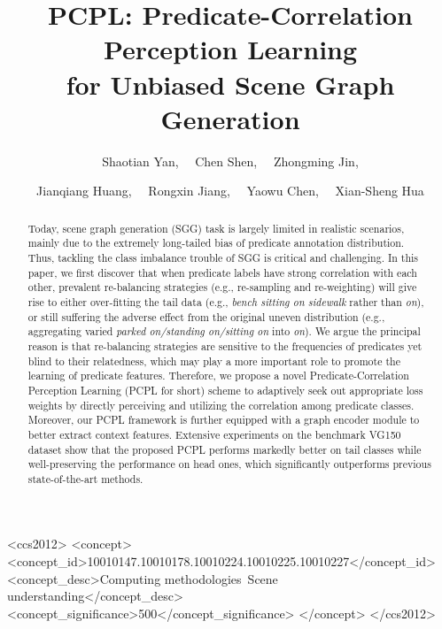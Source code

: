 \documentclass[sigconf]{acmart}
\begin{document}
\fancyhead{}
\title{PCPL: Predicate-Correlation Perception Learning \\ for Unbiased Scene Graph Generation}

\author{Shaotian Yan, \ \ Chen Shen, \ \ Zhongming Jin, }
\author{Jianqiang Huang, \ \ Rongxin Jiang, \ \ Yaowu Chen, \ \ Xian-Sheng Hua }


\renewcommand{\shortauthors}{Yan et al.}
\renewcommand{\thefootnote}{\fnsymbol{footnote}}
\begin{abstract}
  Today, scene graph generation (SGG) task is largely limited in realistic scenarios, mainly due to the extremely long-tailed bias of predicate annotation distribution.
  Thus, tackling the class imbalance trouble of SGG is critical and challenging. 
  In this paper, we first discover that when predicate labels have strong correlation with each other, prevalent re-balancing strategies (e.g., re-sampling and re-weighting) will give rise to either over-fitting the tail data (e.g., \emph{bench sitting on sidewalk} rather than \emph{on}), or still suffering the adverse effect from the original uneven distribution (e.g., aggregating varied \emph{parked on/standing on/sitting on} into \emph{on}). 
  We argue the principal reason is that re-balancing strategies are sensitive to the frequencies of predicates yet blind to their relatedness, which may play a more important role to promote the learning of predicate features.
  Therefore, we propose a novel Predicate-Correlation Perception Learning (PCPL for short) scheme to adaptively seek out appropriate loss weights by directly perceiving and utilizing the correlation among predicate classes. 
  Moreover, our PCPL framework is further equipped with a graph encoder module to better extract context features. Extensive experiments on the benchmark VG150 dataset show that the proposed PCPL performs markedly better on tail classes while well-preserving the performance on head ones,  which significantly outperforms previous state-of-the-art methods.
\end{abstract}

\begin{CCSXML}
<ccs2012>
<concept>
<concept_id>10010147.10010178.10010224.10010225.10010227</concept_id>
<concept_desc>Computing methodologies~Scene understanding</concept_desc>
<concept_significance>500</concept_significance>
</concept>
</ccs2012>
\end{CCSXML}
\end{document}
